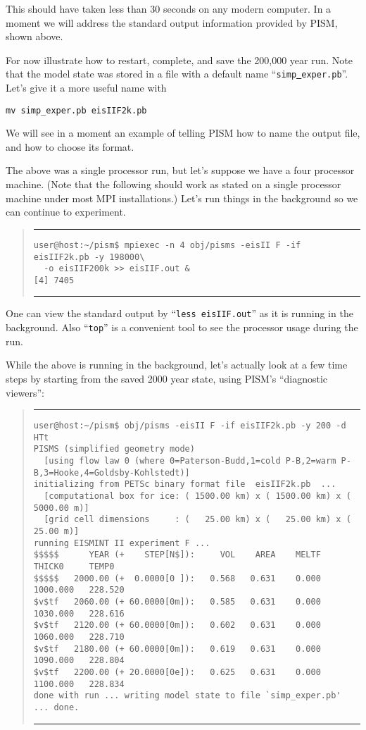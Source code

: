 \documentclass[11pt,final]{amsart}
\renewcommand{\t}[1]{\texttt{#1}}
\newcommand{\Vend}{ \rule{4.6in}{0.1mm}\end{quote}\normalsize }
\newcommand{\beginV}{ \scriptsize\begin{quote}\rule{4.6in}{0.1mm}\begin{verbatim} }
\begin{document}
This should have taken less than 30 seconds on any modern computer.  In a moment we will address the standard output information provided by PISM, shown above.

For now illustrate how to restart, complete, and save the 200,000 year run.  Note that the model state was stored in a file with a default name ``\texttt{simp\underline{ }exper.pb}''.  Let's give it a more useful name with

\verb|mv simp_exper.pb eisIIF2k.pb|

\noindent We will see in a moment an example of telling PISM how to name the output file, and how to choose its format.

The above was a single processor run, but let's suppose we have a four processor machine.  (Note that the following should work as stated on a single processor machine under most MPI installations.)  Let's run things in the background so we can continue to experiment.

\beginV
user@host:~/pism$ mpiexec -n 4 obj/pisms -eisII F -if eisIIF2k.pb -y 198000\
  -o eisIIF200k >> eisIIF.out &
[4] 7405
\end{verbatim}
\Vend

One can view the standard output by ``\t{less eisIIF.out}'' as it is running in the background.  Also ``\t{top}'' is a convenient tool to see the processor usage during the run.

While the above is running in the background, let's actually look at a few time steps by starting from the saved 2000 year state, using PISM's ``diagnostic viewers'':

\beginV
user@host:~/pism$ obj/pisms -eisII F -if eisIIF2k.pb -y 200 -d HTt
PISMS (simplified geometry mode)
  [using flow law 0 (where 0=Paterson-Budd,1=cold P-B,2=warm P-B,3=Hooke,4=Goldsby-Kohlstedt)]
initializing from PETSc binary format file  eisIIF2k.pb  ...
  [computational box for ice: ( 1500.00 km) x ( 1500.00 km) x ( 5000.00 m)]
  [grid cell dimensions     : (   25.00 km) x (   25.00 km) x (   25.00 m)]
running EISMINT II experiment F ...
$$$$$      YEAR (+    STEP[N$]):     VOL    AREA    MELTF     THICK0     TEMP0
$$$$$   2000.00 (+  0.0000[0 ]):   0.568   0.631    0.000   1000.000   228.520
$v$tf   2060.00 (+ 60.0000[0m]):   0.585   0.631    0.000   1030.000   228.616
$v$tf   2120.00 (+ 60.0000[0m]):   0.602   0.631    0.000   1060.000   228.710
$v$tf   2180.00 (+ 60.0000[0m]):   0.619   0.631    0.000   1090.000   228.804
$v$tf   2200.00 (+ 20.0000[0e]):   0.625   0.631    0.000   1100.000   228.834
done with run ... writing model state to file `simp_exper.pb' ... done.
\end{verbatim}
\Vend
\end{document}
